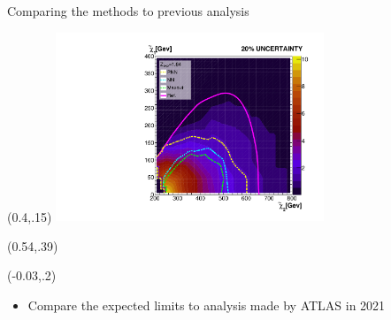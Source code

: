 \documentclass[UKenglish]{beamer}
\begin{document}
\begin{frame}{Comparing the methods to previous analysis}
    \begin{textblock}{1}(0.4,.15)
    \includegraphics[width=0.6\textwidth]{figures/Limits/compLimit20.pdf}
    \end{textblock}
    \begin{textblock}{1}(0.54,.39)
        \scriptsize
        \cite{atlas_search_2021}
    \end{textblock}
    \begin{textblock}{.45}(-0.03,.2)
    \begin{itemize}
        \item Compare the expected limits to analysis made by ATLAS in 2021 \cite{atlas_search_2021}
    \end{itemize}
\end{textblock}
\end{frame}
\end{document}
